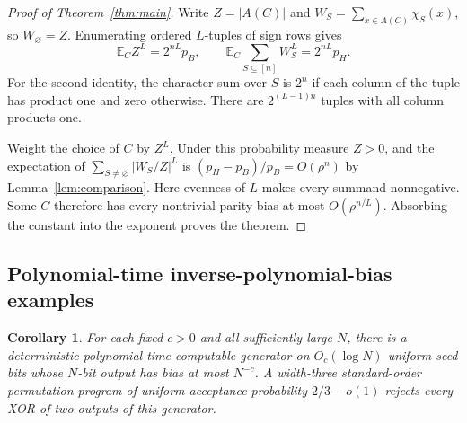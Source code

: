 \documentclass[11pt]{article}
\newtheorem{corollary}[theorem]{Corollary}
\newcommand{\E}{\mathbb E}
\newcommand{\card}[1]{\lvert #1\rvert}
\begin{document}
\begin{proof}[Proof of Theorem~\ref{thm:main}]
Write $Z=\card{A(C)}$ and $W_S=\sum_{x\in A(C)}\chi_S(x)$, so
$W_\varnothing=Z$. Enumerating ordered $L$-tuples of sign rows gives
\[
 \E_C Z^L=2^{nL}p_B,\qquad
 \E_C\sum_{S\subseteq[n]} W_S^L=2^{nL}p_H.
\]
For the second identity, the character sum over $S$ is $2^n$ if
each column of the tuple has product one and zero otherwise.
There are $2^{(L-1)n}$ tuples with all column products one.

Weight the choice of $C$ by $Z^L$. Under this probability measure
$Z>0$, and the expectation of
$\sum_{S\ne\varnothing}|W_S/Z|^L$ is
$(p_H-p_B)/p_B=O(\rho^n)$ by Lemma~\ref{lem:comparison}. Here
evenness of $L$ makes every summand nonnegative. Some $C$ therefore
has every nontrivial parity bias at most $O(\rho^{n/L})$.
Absorbing the constant into the exponent proves the theorem.
\end{proof}

\subsection{Polynomial-time inverse-polynomial-bias examples}

\begin{corollary}\label{cor:explicit}
For each fixed $c>0$ and all sufficiently large $N$, there is a
deterministic polynomial-time computable generator on $O_c(\log N)$
uniform seed bits whose $N$-bit output has bias at most $N^{-c}$.
A width-three standard-order permutation program of uniform acceptance
probability $2/3-o(1)$ rejects every XOR of two outputs of this generator.
\end{corollary}
\end{document}
